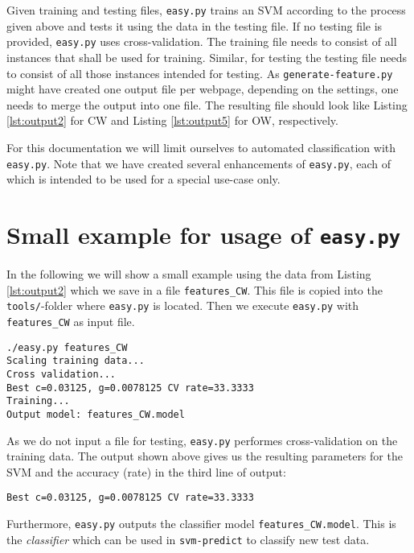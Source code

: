 Given training and testing files, \texttt{easy.py} trains an SVM according to the process given above and tests it using the data in the testing file. If no testing file is provided, \texttt{easy.py} uses cross-validation. The training file needs to consist of all instances that shall be used for training. Similar, for testing the testing file needs to consist of all those instances intended for testing. As \texttt{generate-feature.py} might have created one output file per webpage, depending on the settings, one needs to merge the output into one file. The resulting file should look like Listing \ref{lst:output2} for \ac{CW} and Listing \ref{lst:output5} for \ac{OW}, respectively.

For this documentation we will limit ourselves to automated classification with \texttt{easy.py}. Note that we have created several enhancements of \texttt{easy.py}, each of which is intended to be used for a special use-case only. 

\section{Small example for usage of \texttt{easy.py}}

In the following we will show a small example using the data from Listing \ref{lst:output2} which we save in a file \texttt{features\_CW}. This file is copied into the \texttt{tools/}-folder where \texttt{easy.py} is located. Then we execute \texttt{easy.py} with \texttt{features\_CW} as input file.

\begin{verbatim}
./easy.py features_CW 
Scaling training data...
Cross validation...
Best c=0.03125, g=0.0078125 CV rate=33.3333
Training...
Output model: features_CW.model
\end{verbatim}

As we do not input a file for testing, \texttt{easy.py} performes cross-validation on the training data. The output shown above gives us the resulting parameters for the SVM and the accuracy (rate) in the third line of output:
\begin{verbatim}
Best c=0.03125, g=0.0078125 CV rate=33.3333
\end{verbatim}

Furthermore, \texttt{easy.py} outputs the classifier model \texttt{features\_CW.model}. This is the \emph{classifier} which can be used in \texttt{svm-predict} to classify new test data.

